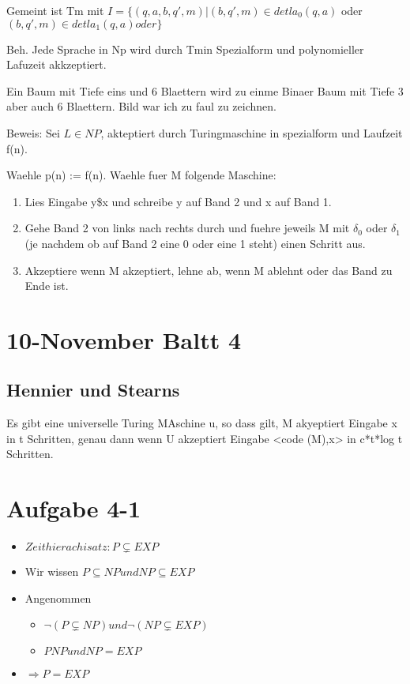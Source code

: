 \documentclass[12pt, oneside, a4paper, numbers=enddot, abstracton, parskip=full]{scrreprt}
\begin{document}
Gemeint ist Tm mit
$I = \{(q,a,b,q',m) | (b,q',m) \in detla_0 (q,a) $ oder
  $(b,q',m) \in detla_1 (q,a) oder\}$

Beh. Jede Sprache in Np wird durch Tmin Spezialform und polynomieller
Lafuzeit akkzeptiert.

Ein Baum mit Tiefe eins und 6 Blaettern wird zu einme Binaer Baum mit
Tiefe 3  aber auch 6 Blaettern. Bild war ich zu faul zu zeichnen.


Beweis: Sei $ L\in NP$, akteptiert durch Turingmaschine in spezialform und
Laufzeit f(n).

Waehle p(n) := f(n).
Waehle fuer M folgende Maschine:
\begin{enumerate}
\item Lies Eingabe y\$x und schreibe y
auf Band 2 und x auf Band 1.
\item Gehe Band 2 von links nach rechts durch und fuehre jeweils M mit
  $\delta_0$ oder $\delta_1$ (je nachdem ob auf Band 2 eine 0 oder
  eine 1 steht) einen Schritt aus.
\item Akzeptiere wenn M akzeptiert, lehne ab, wenn M ablehnt oder das
  Band zu Ende ist.
\end{enumerate}


\section{10-November Baltt 4}
\subsection{Hennier und Stearns}
Es gibt eine universelle Turing MAschine u, so dass gilt, M akyeptiert
Eingabe x  in t Schritten, genau dann wenn U akzeptiert Eingabe <code
(M),x> in c*t*log t Schritten.

\section{Aufgabe 4-1}
\begin{itemize}
\item $ Zeithierachisatz: P \subsetneq EXP $
\item Wir wissen $P \subseteq NP und NP \subseteq EXP $
\item Angenommen
\begin{itemize}
\item $\neg (P\subsetneq NP) und \neg (NP \subsetneq EXP)$
\item $PNP und NP = EXP $
\end{itemize}
\item $\Rightarrow P = EXP$
\end{itemize}
\end{document}
